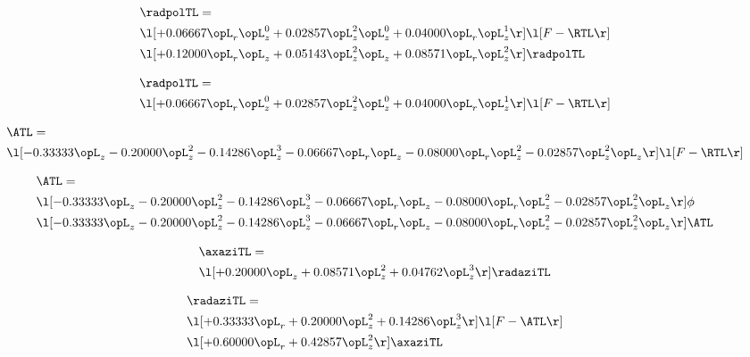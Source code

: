 \begin{alignat}{2} 
\label{eq:linradpolTL_2} 
& \radpolTL = \\ 
& \l[ + 0.06667 \opL_r \opL_z^{0} + 0.02857 \opL_z^{2} \opL_z^{0} + 0.04000 \opL_r \opL_z^{1}  \r] \l[ F - \RTL \r] \nonumber \\ 
& \l[ + 0.12000 \opL_r \opL_z + 0.05143 \opL_z^{2} \opL_z + 0.08571 \opL_r \opL_z^{2}  \r] \radpolTL \nonumber \\ 
\end{alignat} 


\begin{alignat}{2} 
\label{eq:linradpolTL_3} 
& \radpolTL = \\ 
& \l[ + 0.06667 \opL_r \opL_z^{0} + 0.02857 \opL_z^{2} \opL_z^{0} + 0.04000 \opL_r \opL_z^{1}  \r] \l[ F - \RTL \r] \nonumber \\ 
\end{alignat} 


\begin{alignat}{2} 
\label{eq:isoATL_1} 
& \ATL = \\ 
& \l[   -0.33333 \opL_z   -0.20000 \opL_z^{2}   -0.14286 \opL_z^{3}   -0.06667 \opL_r \opL_z   -0.08000 \opL_r \opL_z^{2}   -0.02857 \opL_z^{2} \opL_z  \r] \l[ F - \RTL \r] \nonumber \\ 
\end{alignat} 


\begin{alignat}{2} 
\label{eq:isoATL_2} 
& \ATL = \\ 
& \l[   -0.33333 \opL_z   -0.20000 \opL_z^{2}   -0.14286 \opL_z^{3}   -0.06667 \opL_r \opL_z   -0.08000 \opL_r \opL_z^{2}   -0.02857 \opL_z^{2} \opL_z  \r] \phi \nonumber \\ 
& \l[   -0.33333 \opL_z   -0.20000 \opL_z^{2}   -0.14286 \opL_z^{3}   -0.06667 \opL_r \opL_z   -0.08000 \opL_r \opL_z^{2}   -0.02857 \opL_z^{2} \opL_z  \r] \ATL \nonumber \\ 
\end{alignat} 


\begin{alignat}{2} 
\label{eq:linaxaziTL_0} 
& \axaziTL = \\ 
& \l[ + 0.20000 \opL_z + 0.08571 \opL_z^{2} + 0.04762 \opL_z^{3}  \r] \radaziTL \nonumber \\ 
\end{alignat} 


\begin{alignat}{2} 
\label{eq:linradaziTL_0} 
& \radaziTL = \\ 
& \l[ + 0.33333 \opL_r + 0.20000 \opL_z^{2} + 0.14286 \opL_z^{3}  \r] \l[ F - \ATL \r] \nonumber \\ 
& \l[ + 0.60000 \opL_r + 0.42857 \opL_z^{2}  \r] \axaziTL \nonumber \\ 
\end{alignat} 



